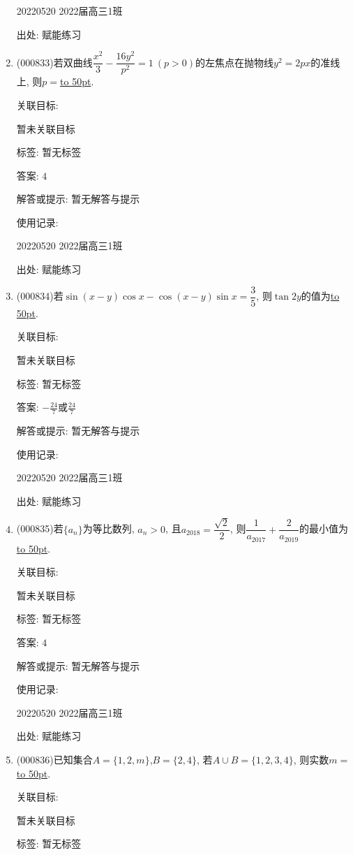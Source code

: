\documentclass[10pt,a4paper]{article}
\newcommand{\blank}[1]{\underline{\hbox to #1pt{}}}
\begin{document}
\begin{enumerate}[1.]
20220520	2022届高三1班	


出处: 赋能练习
\item { (000833)}若双曲线$\dfrac{x^2}3-\dfrac{16y^2}{p^2}=1\ (p>0)$的左焦点在抛物线$y^2=2px$的准线上, 则$p=$\blank{50}.


关联目标:

暂未关联目标



标签: 暂无标签

答案: $4$

解答或提示: 暂无解答与提示

使用记录:

20220520	2022届高三1班	


出处: 赋能练习
\item { (000834)}若$\sin(x-y)\cos x-\cos(x-y)\sin x=\dfrac35$, 则$\tan 2y$的值为\blank{50}.


关联目标:

暂未关联目标



标签: 暂无标签

答案: $-\frac{24}7$或$\frac{24}7$

解答或提示: 暂无解答与提示

使用记录:

20220520	2022届高三1班	


出处: 赋能练习
\item { (000835)}若$\{a_n\}$为等比数列, $a_n>0$, 且$a_{2018}=\dfrac{\sqrt2}2$, 则$\dfrac1{a_{2017}}+\dfrac2{a_{2019}}$的最小值为\blank{50}.


关联目标:

暂未关联目标



标签: 暂无标签

答案: $4$

解答或提示: 暂无解答与提示

使用记录:

20220520	2022届高三1班	


出处: 赋能练习
\item { (000836)}已知集合$A=\{1,2,m\}$,$B=\{2,4\}$, 若$A\cup B=\{1,2,3,4\}$, 则实数$m=$\blank{50}.


关联目标:

暂未关联目标



标签: 暂无标签


\end{enumerate}
\end{document}
